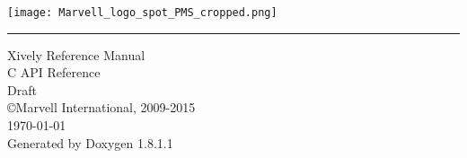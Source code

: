 \documentclass{book}
\newcommand{\TitleHRule}{\rule{\linewidth}{10pt}}
\begin{document}
\SetWatermarkFontSize{3cm}
\hypersetup{pageanchor=false,citecolor=blue}
\begin{titlepage}
\begin{minipage}[t]{\textwidth}
\raggedleft
\texttt{[image: Marvell\_logo\_spot\_PMS\_cropped.png]}
\end{minipage}
\vspace{.5cm}
\TitleHRule
\vspace{3.5cm}
\begin{flushleft}
{\Huge {\color{red} Xively Reference Manual}}\\
\vspace{1cm}
{\Large { C API Reference }}\\
\vspace{.75cm}
{{ Draft }}\\
\vspace{4cm}
{\Large \copyright \space Marvell International, 2009-2015}\\
\vspace{1cm}
{\small {\today \space \currenttime}}\\
{\small Generated by Doxygen 1.8.1.1}\\
\end{flushleft}
\end{titlepage}
\clearemptydoublepage
{}
\tableofcontents
\clearemptydoublepage
{}
\hypersetup{pageanchor=true,citecolor=blue}
\end{document}
